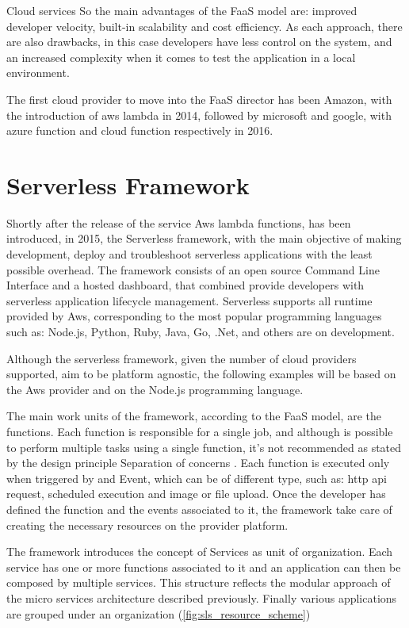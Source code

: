 \begin{chapter}{Cloud services}
    So the main advantages of the FaaS model are: improved developer velocity,
    built-in scalability and cost efficiency. As each approach, there are also drawbacks, in
    this case developers have less control on the system, and an increased complexity when it
    comes to test the application in a local environment.

    The first cloud provider to move into the FaaS director has been Amazon, with the
    introduction of aws lambda in 2014, followed by microsoft and google, with
    azure function and cloud function respectively in 2016.

    \section{Serverless Framework}
    \label{sec:serverless_framework}
    Shortly after the release of the service Aws lambda functions, has been introduced,
    in 2015, the Serverless framework, with the main objective of making development,
    deploy and troubleshoot serverless applications with the least possible overhead.
    The framework consists of an open source Command Line Interface and a hosted
    dashboard, that combined provide developers with serverless application lifecycle
    management. Serverless supports all runtime provided by Aws, corresponding to
    the most popular programming languages such as: Node.js, Python, Ruby, Java,
    Go, .Net, and others are on development.

    Although the serverless framework, given the number of cloud providers supported,
    aim to be platform agnostic, the following examples will be based on the Aws
    provider and on the Node.js programming language.

    The main work units of the framework, according to the FaaS model, are the functions.
    Each function is responsible for a single job, and although is possible to perform
    multiple tasks using a single function, it's not recommended as stated by the
    design principle Separation of concerns \cite{separation_of_concerns}.
    Each function is executed only when triggered by and Event, which can be of different
    type, such as: http api request, scheduled execution and image or file upload.
    Once the developer has defined the function and the events associated to it,
    the framework take care of creating the necessary resources on the provider platform.

    The framework introduces the concept of Services as unit of organization. Each
    service has one or more functions associated to it and an application can then
    be composed by multiple services. This structure reflects the modular approach
    of the micro services architecture described previously. Finally various applications
    are grouped under an organization (\ref{fig:sls_resource_scheme})


\end{chapter}
